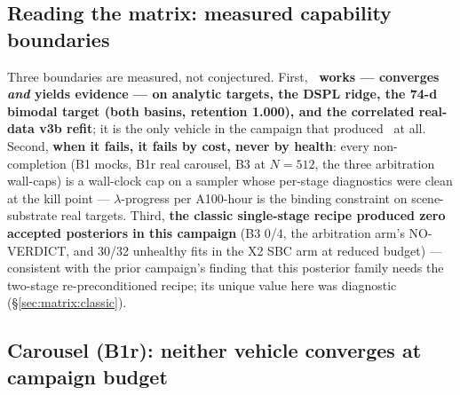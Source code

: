 \subsection{Reading the matrix: measured capability boundaries}
\label{sec:matrix:boundaries}

Three boundaries are measured, not conjectured. First, {\bf \mcsmc\ works ---
converges {\it and} yields evidence --- on analytic targets, the DSPL ridge,
the 74-d bimodal target (both basins, retention 1.000), and the correlated
real-data v3b refit}; it is the only vehicle in the campaign that produced
\logZ\ at all. Second, {\bf when it fails, it fails by cost, never by
health}: every non-completion (B1 mocks, B1r real carousel, B3 at $N{=}512$,
the three arbitration wall-caps) is a wall-clock cap on a sampler whose
per-stage diagnostics were clean at the kill point ---
$\lambda$-progress per A100-hour is the binding constraint on scene-substrate
real targets. Third, {\bf the classic single-stage recipe produced zero
accepted posteriors in this campaign} (B3 0/4, the arbitration arm's
NO-VERDICT, and 30/32 unhealthy fits in the X2 SBC arm at reduced budget) ---
consistent with the prior campaign's finding that this posterior family needs
the two-stage re-preconditioned recipe; its unique value here was diagnostic
(\S\ref{sec:matrix:classic}).

\subsection{Carousel (B1r): neither vehicle converges at campaign budget}
\label{sec:matrix:b1r}

